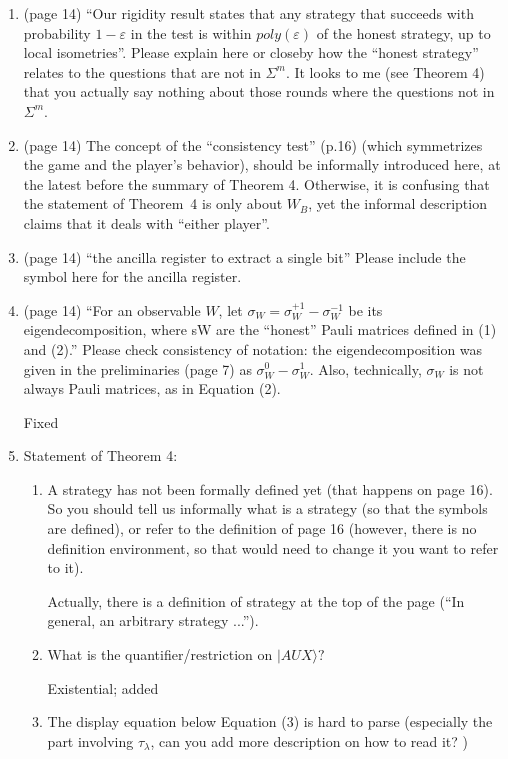 \documentclass[12pt]{article}
\begin{document}
\begin{enumerate}
    \item (page 14) ``Our rigidity result states that any strategy that succeeds with probability $1-\varepsilon$ in the test is within $poly(\varepsilon)$ of
the honest strategy, up to local isometries''. Please explain here or closeby how the ``honest strategy'' relates to the questions that are not in $\Sigma^m$. It looks to me (see Theorem 4) that you actually say nothing about those rounds where the questions not in  $\Sigma^m$.
\item (page 14) The concept of the ``consistency test'' (p.16) (which symmetrizes the game and the player's behavior), should be informally introduced here, at the latest before the summary of Theorem 4. Otherwise, it is confusing that the statement of Theorem~4 is only about $W_B$, yet the informal description claims that it deals with ``either player''.
    \item (page 14) ``the ancilla register to extract a single bit'' Please include the symbol here for the ancilla register.
        \item (page 14) ``For an observable $W$, let $\sigma_W = \sigma_W^{+1}-\sigma_W^{-1}$ be its eigendecomposition, where sW are the “honest”
Pauli matrices defined in (1) and (2).'' Please check consistency of notation: the eigendecomposition was given in the preliminaries (page 7) as $\sigma_W^{0}-\sigma_W^{1}$. Also, technically, $\sigma_W$ is not always Pauli matrices, as in Equation (2).

{\color{blue} Fixed}

\item Statement of Theorem 4:
\begin{enumerate}
\item A strategy has not been formally defined yet (that happens on page 16). So you should tell us informally what is a strategy (so that the symbols are defined), or refer to the definition of page 16 (however, there is no definition environment, so that would need to change it you want to refer to it).

{\color{blue} Actually, there is a definition of strategy at the top of the page (``In general, an arbitrary strategy ...''). }

 \item What is the quantifier/restriction on $|AUX\rangle?$

{\color{blue} Existential; added}

 \item   The display equation below Equation (3) is hard to parse (especially the part involving $\tau_\lambda$, can you add more description on how to read it? )


\end{enumerate}
\end{enumerate}
\end{document}
